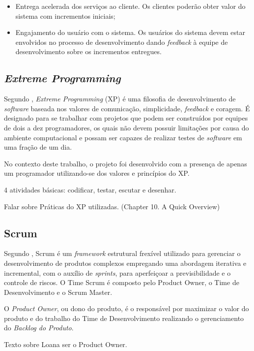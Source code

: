\begin{itemize}
    \item Entrega acelerada dos serviços ao cliente. Os clientes poderão obter valor do sistema com incrementos iniciais;
    \item Engajamento do usuário com o sistema. Os usuários do sistema devem estar envolvidos no processo
    de desenvolvimento dando \textit{feedback} à equipe de desenvolvimento sobre os incrementos entregues.
\end{itemize}

    \subsection{\textit{Extreme Programming}}
    Segundo \cite{beck_2004}, \textit{Extreme Programming} (XP) é uma filosofia de desenvolvimento de \textit{software} baseada nos valores de comunicação, simplicidade, \textit{feedback} e coragem. É designado para se trabalhar com projetos que podem ser
    construídos por equipes de dois a dez programadores, os quais não devem possuir limitações
    por causa do ambiente computacional e possam ser capazes de realizar testes de
    \textit{software} em uma fração de um dia.

    No contexto deste trabalho, o projeto foi desenvolvido com a presença de apenas um
    programador utilizando-se dos valores e princípios do XP.

    4 atividades básicas: codificar, testar, escutar e desenhar.

    Falar sobre Práticas do XP utilizadas. (Chapter 10. A Quick Overview)

    \subsection{Scrum}
    Segundo \cite{scrum_guide}, Scrum é um \textit{framework} estrutural frexível utilizado
    para gerenciar o desenvolvimento de produtos complexos empregando uma abordagem iterativa
    e incremental, com o auxílio de \textit{sprints}, para aperfeiçoar a previsibilidade e o controle de riscos. O Time Scrum é composto pelo Product Owner, o Time de Desenvolvimento e o Scrum Master.

    O \textit{Product Owner}, ou dono do produto, é o responsável por maximizar o valor
    do produto e do trabalho do Time de Desenvolvimento realizando o gerenciamento
    do \textit{Backlog do Produto}.

    Texto sobre Loana ser o Product Owner.

